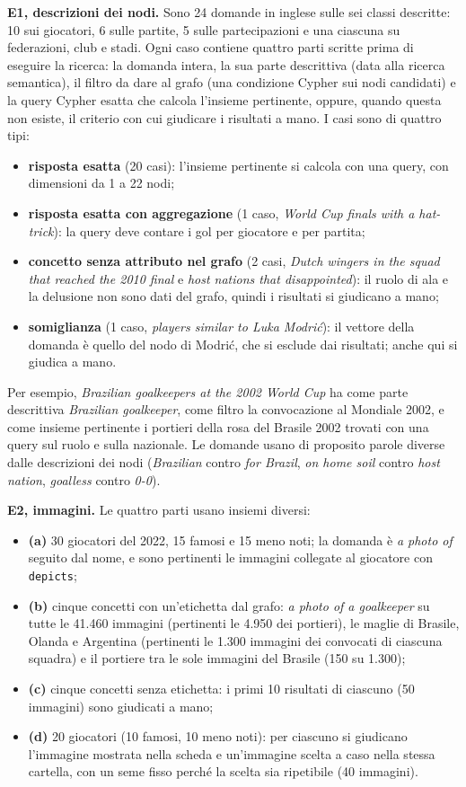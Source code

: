 \documentclass[11pt,a4paper]{article}
\newcommand{\code}[1]{\texttt{\small #1}}
\begin{document}
\textbf{E1, descrizioni dei nodi.} Sono 24 domande in inglese sulle sei classi descritte: 10 sui giocatori, 6 sulle partite, 5 sulle partecipazioni e una ciascuna su federazioni, club e stadi. Ogni caso contiene quattro parti scritte prima di eseguire la ricerca: la domanda intera, la sua parte descrittiva (data alla ricerca semantica), il filtro da dare al grafo (una condizione Cypher sui nodi candidati) e la query Cypher esatta che calcola l'insieme pertinente, oppure, quando questa non esiste, il criterio con cui giudicare i risultati a mano. I casi sono di quattro tipi:
\begin{itemize}
  \item \textbf{risposta esatta} (20 casi): l'insieme pertinente si calcola con una query, con dimensioni da 1 a 22 nodi;
  \item \textbf{risposta esatta con aggregazione} (1 caso, \emph{World Cup finals with a hat-trick}): la query deve contare i gol per giocatore e per partita;
  \item \textbf{concetto senza attributo nel grafo} (2 casi, \emph{Dutch wingers in the squad that reached the 2010 final} e \emph{host nations that disappointed}): il ruolo di ala e la delusione non sono dati del grafo, quindi i risultati si giudicano a mano;
  \item \textbf{somiglianza} (1 caso, \emph{players similar to Luka Modrić}): il vettore della domanda è quello del nodo di Modrić, che si esclude dai risultati; anche qui si giudica a mano.
\end{itemize}
Per esempio, \emph{Brazilian goalkeepers at the 2002 World Cup} ha come parte descrittiva \emph{Brazilian goalkeeper}, come filtro la convocazione al Mondiale 2002, e come insieme pertinente i portieri della rosa del Brasile 2002 trovati con una query sul ruolo e sulla nazionale. Le domande usano di proposito parole diverse dalle descrizioni dei nodi (\emph{Brazilian} contro \emph{for Brazil}, \emph{on home soil} contro \emph{host nation}, \emph{goalless} contro \emph{0-0}).

\textbf{E2, immagini.} Le quattro parti usano insiemi diversi:
\begin{itemize}
  \item \textbf{(a)} 30 giocatori del 2022, 15 famosi e 15 meno noti; la domanda è \emph{a photo of} seguito dal nome, e sono pertinenti le immagini collegate al giocatore con \code{depicts};
  \item \textbf{(b)} cinque concetti con un'etichetta dal grafo: \emph{a photo of a goalkeeper} su tutte le 41.460 immagini (pertinenti le 4.950 dei portieri), le maglie di Brasile, Olanda e Argentina (pertinenti le 1.300 immagini dei convocati di ciascuna squadra) e il portiere tra le sole immagini del Brasile (150 su 1.300);
  \item \textbf{(c)} cinque concetti senza etichetta: i primi 10 risultati di ciascuno (50 immagini) sono giudicati a mano;
  \item \textbf{(d)} 20 giocatori (10 famosi, 10 meno noti): per ciascuno si giudicano l'immagine mostrata nella scheda e un'immagine scelta a caso nella stessa cartella, con un seme fisso perché la scelta sia ripetibile (40 immagini).
\end{itemize}
\end{document}
